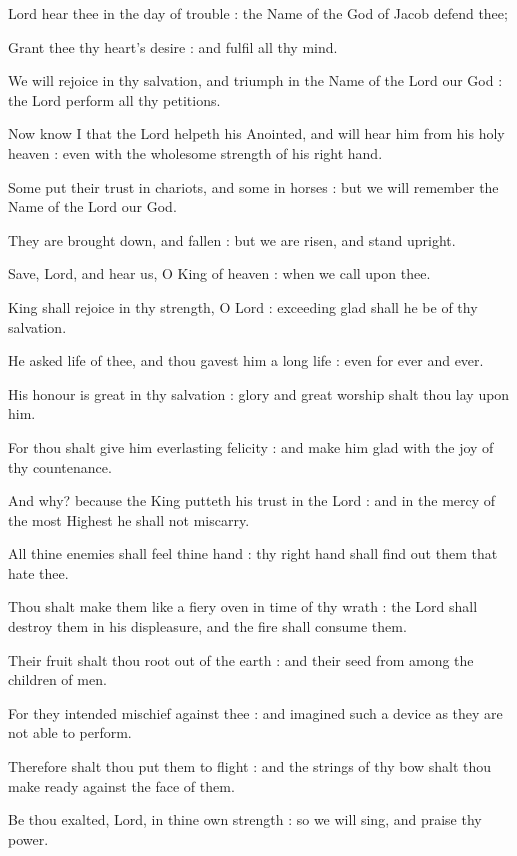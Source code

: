  Lord hear thee in the day of trouble : the Name of the God of Jacob defend thee;\par
{}
Grant thee thy heart's desire : and fulfil all thy mind.\par
{}We will rejoice in thy salvation, and triumph in the Name of the Lord our God : the Lord perform all thy petitions.\par
{}Now know I that the Lord helpeth his Anointed, and will hear him from his holy heaven : even with the wholesome strength of his right hand.\par
{}Some put their trust in chariots, and some in horses : but we will remember the Name of the Lord our God.\par
{}They are brought down, and fallen : but we are risen, and stand upright.\par
{}Save, Lord, and hear us, O King of heaven : when we call upon thee.\par


 King shall rejoice in thy strength, O Lord : exceeding glad shall he be of thy salvation.\par
{}
He asked life of thee, and thou gavest him a long life : even for ever and ever.\par
{}His honour is great in thy salvation : glory and great worship shalt thou lay upon him.\par
{}For thou shalt give him everlasting felicity : and make him glad with the joy of thy countenance.\par
{}And why? because the King putteth his trust in the Lord : and in the mercy of the most Highest he shall not miscarry.\par
{}All thine enemies shall feel thine hand : thy right hand shall find out them that hate thee.\par
{}Thou shalt make them like a fiery oven in time of thy wrath : the Lord shall destroy them in his displeasure, and the fire shall consume them.\par
{}Their fruit shalt thou root out of the earth : and their seed from among the children of men.\par
{}For they intended mischief against thee : and imagined such a device as they are not able to perform.\par
{}Therefore shalt thou put them to flight : and the strings of thy bow shalt thou make ready against the face of them.\par
{}Be thou exalted, Lord, in thine own strength : so we will sing, and praise thy power.\par


